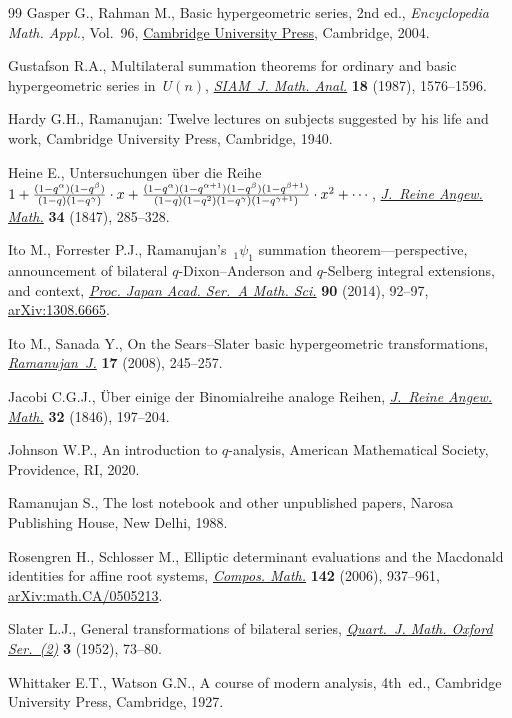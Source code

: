 \begin{thebibliography}{99}
Gasper G., Rahman M., Basic hypergeometric series, 2nd ed., \textit{Encyclopedia Math.
 Appl.}, Vol.~96,
 \href{https://doi.org/10.1017/CBO9780511526251}{Cambridge University Press},
 Cambridge, 2004.

Gustafson R.A., Multilateral summation theorems for ordinary and basic
 hypergeometric series in~{$U(n)$},
 \href{https://doi.org/10.1137/0518114}{\textit{SIAM~J. Math. Anal.}}
 \textbf{18} (1987), 1576--1596.

Hardy G.H., Ramanujan: {T}welve lectures on subjects suggested by his life and
 work, Cambridge University Press, Cambridge, 1940.

Heine E., Untersuchungen \"uber die {R}eihe $1+{(1-q^{\alpha})(1-q^{\beta})
 \over (1-q)(1-q^{\gamma})} \cdot x +
 {(1-q^{\alpha})(1-q^{\alpha+1})(1-q^{\beta})(1-q^{\beta+1}) \over
 (1-q)(1-q^2)(1-q^{\gamma})(1-q^{\gamma+1})} \cdot x^2 + \cdots$,
 \href{https://doi.org/10.1515/crll.1847.34.285}{\textit{J.~Reine Angew.
 Math.}} \textbf{34} (1847), 285--328.

Ito M., Forrester P.J., Ramanujan's~{${}_1\psi_1$} summation
 theorem---perspective, announcement of bilateral {$q$}-{D}ixon--{A}nderson
 and {$q$}-{S}elberg integral extensions, and context,
 \href{https://doi.org/10.3792/pjaa.90.92}{\textit{Proc. Japan Acad. Ser.~A
 Math. Sci.}} \textbf{90} (2014), 92--97,
 \href{http://arxiv.org/abs/1308.6665}{arXiv:1308.6665}.

Ito M., Sanada Y., On the {S}ears--{S}later basic hypergeometric
 transformations,
 \href{https://doi.org/10.1007/s11139-006-9012-6}{\textit{Ramanujan~J.}}
 \textbf{17} (2008), 245--257.

Jacobi C.G.J., \"Uber einige der {B}inomialreihe analoge {R}eihen,
 \href{https://doi.org/10.1515/crll.1846.32.197}{\textit{J.~Reine Angew.
 Math.}} \textbf{32} (1846), 197--204.

Johnson W.P., An introduction to {$q$}-analysis, American Mathematical Society,
 Providence, RI, 2020.

Ramanujan S., The lost notebook and other unpublished papers, Narosa Publishing
 House, New Delhi, 1988.

Rosengren H., Schlosser M., Elliptic determinant evaluations and the
 {M}acdonald identities for affine root systems,
 \href{https://doi.org/10.1112/S0010437X0600203X}{\textit{Compos. Math.}}
 \textbf{142} (2006), 937--961,
 \href{http://arxiv.org/abs/math.CA/0505213}{arXiv:math.CA/0505213}.

Slater L.J., General transformations of bilateral series,
 \href{https://doi.org/10.1093/qmath/3.1.73}{\textit{Quart.~J. Math. Oxford
 Ser.~(2)}} \textbf{3} (1952), 73--80.

Whittaker E.T., Watson G.N., A course of modern analysis, 4th~ed., Cambridge University Press,  Cambridge, 1927.

\end{thebibliography}
